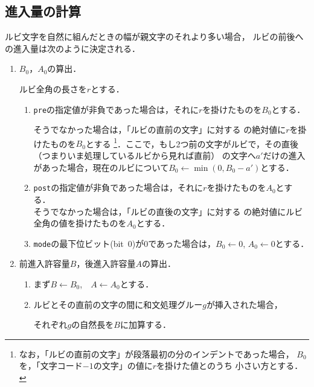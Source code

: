 \documentclass[a4paper,10ptj]{ltjsarticle}
\makeatletter
\def\emph#1{\textbf{\textgt{#1}}}
\def\cs#1{\eghostguarded{\texttt{\textbackslash#1}}}
\let\origunderscore=\_
\def\_{\ifx\f@family\ttdefault\origunderscore\else
  \leavevmode \kern .06em\vbox {\hrule \@width .333em}\fi}
\makeatother
\begin{document}
\subsection{進入量の計算}
\label{ssec:calc_intrusion}
ルビ文字を自然に組んだときの幅が親文字のそれより多い場合，
ルビの前後への進入量は次のように決定される．
\begin{enumerate}[label=\emph{Step~\arabic*},labelindent=0pt,itemindent=*,itemsep=\medskipamount]
  \item {}$B_0$，$A_0$の算出．
  
  ルビ全角の長さを$r$とする．
  \begin{enumerate}
   \item \texttt{pre}の指定値が非負であった場合は，それに$r$を掛けたものを$B_0$とする．

    そうでなかった場合は，「ルビの直前の文字」に対する
    の絶対値に$r$を掛けたものを$B_0$とする
    \footnote{%
      なお，「ルビの直前の文字」が段落最初の\cs{parindent}分のインデントであった場合，
      $B_0$を，「文字コード$-1$の文字」の値に$r$を掛けた値と\cs{parindent}のうち
      小さい方とする．
    }．ここで，もし2つ前の文字がルビで，その直後（つまりいま処理しているルビから見れば直前）
    の文字へ$a'$だけの進入があった場合，現在のルビについて$B_0←\min(0,B_0-a')$とする．
   \item \texttt{post}の指定値が非負であった場合は，それに$r$を掛けたものを$A_0$とする．\\
    そうでなかった場合は，「ルビの直後の文字」に対する
    の絶対値にルビ全角の値を掛けたものを$A_0$とする．
   \item \texttt{mode}の最下位ビット(bit~0)が0であった場合は，$B_0\leftarrow 0$, $A_0\leftarrow 0$とする．
  \end{enumerate}
  \item 前進入許容量$B$，後進入許容量$A$の算出．
  \begin{enumerate}
    \item まず$B\leftarrow B_0$,\ \ $A\leftarrow A_0$とする．
    \item ルビとその直前の文字の間に和文処理グルー$g$が挿入された場合，
    それぞれ$g$の自然長を$B$に加算する．


\end{enumerate}
\end{enumerate}
\end{document}
